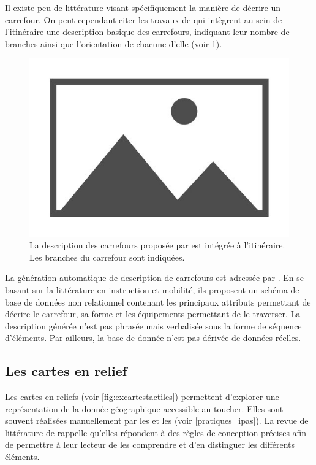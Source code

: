
\newpar{}

Il existe peu de littérature visant spécifiquement la manière de décrire un carrefour. On peut cependant citer les travaux de \cite{gaunet_verbal_2006} qui intègrent au sein de l'itinéraire une description basique des carrefours, indiquant leur nombre de branches ainsi que l'orientation de chacune d'elle (voir \ref{fig:exdesccarrefour}).

\begin{figure}
    \centering
    \includegraphics{images/placeholder.jpg}
    \caption{La description des carrefours proposée par \cite{gaunet_verbal_2006} est intégrée à l'itinéraire. Les branches du carrefour sont indiquées.}
    \label{fig:exdesccarrefour}
\end{figure}

La génération automatique de description de carrefours est adressée par \cite{Guth2019}. En se basant sur la littérature en instruction et mobilité, ils proposent un schéma de base de données non relationnel contenant les principaux attributs permettant de décrire le carrefour, sa forme et les équipements permettant de le traverser. La description générée n'est pas phrasée mais verbalisée sous la forme de séquence d'éléments. Par ailleurs, la base de donnée n'est pas dérivée de données réelles.

\subsection{Les cartes en relief}

Les cartes en reliefs (voir \ref{fig:excartestactiles}) permettent d'explorer une représentation de la donnée géographique accessible au toucher. Elles sont souvent réalisées manuellement par les \ipas{} et les \adts{} (voir \ref{pratiques_ipas}). La revue de littérature de \cite{Wabinski2022} rappelle qu'elles répondent à des règles de conception précises afin de permettre à leur lecteur de les comprendre et d'en distinguer les différents éléments.


